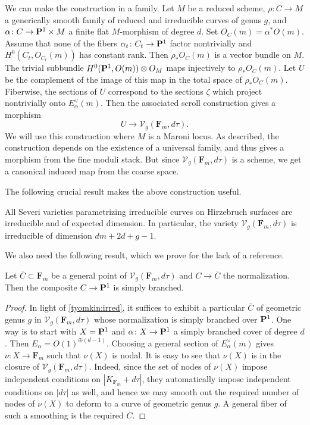 \documentclass{article}
\renewcommand {\P}{{\bf P}}
\providecommand {\from}{{\colon}}
\newcommand{\V}{\mathcal V}
\newcommand{\F}{{\mathbf F}}
\numberwithin{equation}{section}
\begin{document}
We can make the construction in a family. Let $M$ be a reduced scheme, $\rho \from C \to M$ a generically smooth family of reduced and irreducible curves of genus $g$, and $\alpha \from C \to \P^1 \times M$ a finite flat $M$-morphism of degree $d$. Set $O_C(m) = \alpha^*O(m)$. Assume that none of the fibers $\alpha_t \from C_t \to \P^1$ factor nontrivially and $H^0(C_t, O_{C_t}(m))$ has constant rank. Then $\rho_*O_C(m)$ is a vector bundle on $M$. The trivial subbundle $H^0(\P^1, O(m)) \otimes O_M$ maps injectively to $\rho_*O_C(m)$. Let $U$ be the complement of the image of this map in the total space of $\rho_* O_C(m)$. Fiberwise, the sections of $U$ correspond to the sections $\zeta$ which project nontrivially onto $E_\alpha^\vee(m)$. Then the associated scroll construction gives a morphism 
\[U \to \V_g(\F_m,d\tau).\]
We will use this construction where $M$ is a Maroni locus. As described, the construction depends on the existence of a universal family, and thus gives a morphism from the fine moduli stack. But since $\V_g(\F_m,d\tau)$ is a scheme, we get a canonical induced map from the coarse space.

The following crucial result makes the above construction useful.
\begin{theorem}\label{tyomkin:irred}
  All Severi varieties parametrizing irreducible curves on Hirzebruch surfaces are irreducible and of expected dimension. In particular, the variety $\V_g(\F_m,d\tau)$ is irreducible of dimension $dm+2d+g-1$.
\end{theorem}

We also need the following result, which we prove for the lack of a reference.
\begin{proposition}\label{thm:severi_simply_branched}
  Let $\overline C \subset \F_m$ be a general point of $\V_g(\F_m,d\tau)$ and $C \to \overline C$ the normalization. Then the composite $C \to \P^1$ is simply branched.
\end{proposition}
\begin{proof}
  In light of \autoref{tyomkin:irred}, it suffices to exhibit a particular $\overline C$ of geometric genus $g$ in $\V_g(\F_m,d\tau)$ whose normalization is simply branched over $\P^1$. One way is to start with $X = \P^1$ and $\alpha \from X \to \P^1$ a simply branched cover of degree $d$. Then $E_\alpha = O(1)^{\oplus (d-1)}$. Choosing a general section of $E^\vee_\alpha(m)$ gives $\nu \from X \to \F_m$ such that $\nu(X)$ is nodal. It is easy to see that $\nu(X)$ is in the closure of $\V_g(\F_m,d\tau)$. Indeed, since the set of nodes of $\nu(X)$ impose independent conditions on $|K_{\F_m} + d\tau|$, they automatically impose independent conditions on $|d\tau|$ as well, and hence we may smooth out the required number of nodes of $\nu(X)$ to deform to a curve of geometric genus $g$. A general fiber of such a smoothing is the required $\overline C$.
\end{proof}
\end{document}
